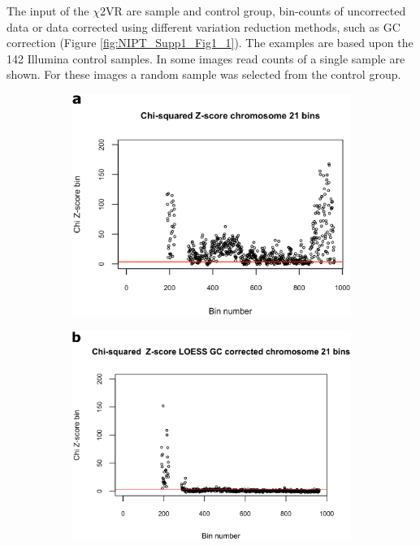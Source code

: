 The input of the $\chi$2VR are sample and control group, bin-counts of uncorrected data or data corrected using different variation reduction methods, such as GC correction (Figure \ref{fig:NIPT_Supp1_Fig1_1}). 
The examples are based upon the 142 Illumina control samples. 
In some images read counts of a single sample are shown. For these images a random sample was selected from the control group.

\begin{figure}[!h]
	\begin{subfigure}{.5\textwidth}
		\centering
		\includegraphics[width=1\linewidth]{img/NIPT_Supp1_Fig1_3a}
		\label{fig:NIPT_Supp1_Fig1_3a}
	\end{subfigure}%
	\begin{subfigure}{.5\textwidth}
		\centering
		\includegraphics[width=1\linewidth]{img/NIPT_Supp1_Fig1_3b}

\end{subfigure}
\end{figure}
